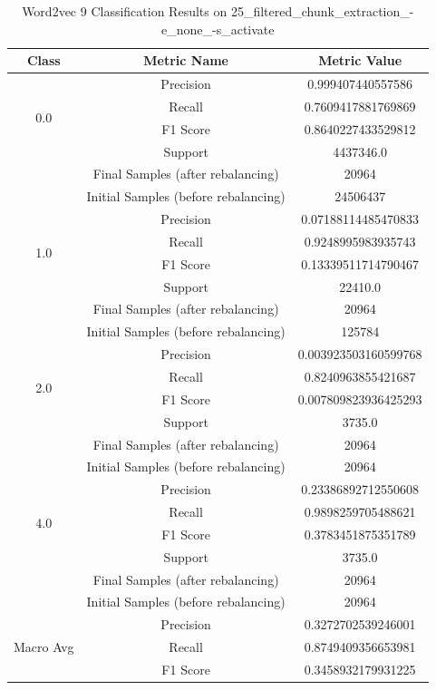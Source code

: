 \begin{longtable}{|c|c|c|}
\caption{Word2vec 9 Classification Results on 25\_filtered\_chunk\_extraction\_-e\_none\_-s\_activate} \label{tab:25_filtered_chunk_extraction_-e_none_-s_activate_word2vec_9_classifiers_results} \\
\hline
Class & Metric Name & Metric Value \\
\hline
\multirow{4}{*}{0.0} & Precision & 0.999407440557586 \\
 & Recall & 0.7609417881769869 \\
 & F1 Score & 0.8640227433529812 \\
 & Support & 4437346.0 \\
 & Final Samples (after rebalancing) & 20964 \\
 & Initial Samples (before rebalancing) & 24506437 \\
\hline
\multirow{4}{*}{1.0} & Precision & 0.07188114485470833 \\
 & Recall & 0.9248995983935743 \\
 & F1 Score & 0.13339511714790467 \\
 & Support & 22410.0 \\
 & Final Samples (after rebalancing) & 20964 \\
 & Initial Samples (before rebalancing) & 125784 \\
\hline
\multirow{4}{*}{2.0} & Precision & 0.003923503160599768 \\
 & Recall & 0.8240963855421687 \\
 & F1 Score & 0.007809823936425293 \\
 & Support & 3735.0 \\
 & Final Samples (after rebalancing) & 20964 \\
 & Initial Samples (before rebalancing) & 20964 \\
\hline
\multirow{4}{*}{4.0} & Precision & 0.23386892712550608 \\
 & Recall & 0.9898259705488621 \\
 & F1 Score & 0.3783451875351789 \\
 & Support & 3735.0 \\
 & Final Samples (after rebalancing) & 20964 \\
 & Initial Samples (before rebalancing) & 20964 \\
\hline
\multirow{4}{*}{Macro Avg} & Precision & 0.3272702539246001 \\
 & Recall & 0.8749409356653981 \\
 & F1 Score & 0.3458932179931225 \\

\end{longtable}
